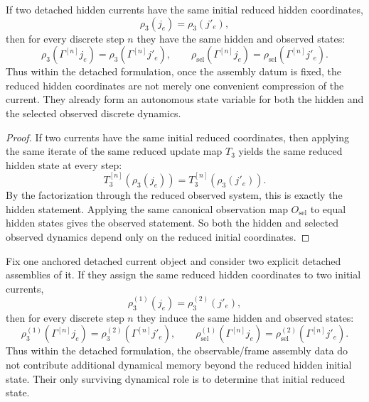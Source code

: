 \begin{corollary}
\label{thm:reduced-hidden-coordinates-are-already-the-autonomous-detached-state-variable}
If two detached hidden currents have the same initial reduced hidden
coordinates,
\[
\rho_3(j_e)=\rho_3(j'_e),
\]
then for every discrete step \(n\) they have the same hidden and observed
states:
\[
\rho_3(\Gamma^{[n]} j_e)=\rho_3(\Gamma^{[n]} j'_e),
\qquad
\rho_{\mathrm{sel}}(\Gamma^{[n]} j_e)=
\rho_{\mathrm{sel}}(\Gamma^{[n]} j'_e).
\]
Thus within the detached formulation, once the assembly datum is fixed, the reduced
hidden coordinates are not merely one convenient compression of the current.
They already form an autonomous state variable for both the hidden and the
selected observed discrete dynamics.
\end{corollary}

\begin{proof}
If two currents have the same initial reduced coordinates, then applying the
same iterate of the same reduced update map \(T_3\) yields the same reduced
hidden state at every step:
\[
T_3^{[n]}(\rho_3(j_e))=T_3^{[n]}(\rho_3(j'_e)).
\]
By the factorization through the reduced observed system, this is exactly the
hidden statement. Applying the same canonical observation map
\(O_{\mathrm{sel}}\) to equal hidden states gives the observed statement. So
both the hidden and selected observed dynamics depend only on the reduced
initial coordinates.
\end{proof}

\begin{corollary}
\label{thm:explicit-detached-assemblies-matter-dynamically-only-through-the-reduced-initial-state}
Fix one anchored detached current object and consider two explicit detached
assemblies of it. If they assign the same reduced hidden coordinates to two
initial currents,
\[
\rho_3^{(1)}(j_e)=\rho_3^{(2)}(j'_e),
\]
then for every discrete step \(n\) they induce the same hidden and observed
states:
\[
\rho_3^{(1)}(\Gamma^{[n]} j_e)=\rho_3^{(2)}(\Gamma^{[n]} j'_e),
\qquad
\rho_{\mathrm{sel}}^{(1)}(\Gamma^{[n]} j_e)=
\rho_{\mathrm{sel}}^{(2)}(\Gamma^{[n]} j'_e).
\]
Thus within the detached formulation, the observable/frame assembly data do not contribute
additional dynamical memory beyond the reduced hidden initial state. Their
only surviving dynamical role is to determine that initial reduced state.
\end{corollary}

